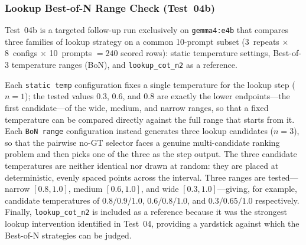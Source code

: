 \subsubsection{Lookup Best-of-N Range Check (Test~04b)}
\label{subsec:res04b}

Test~04b is a targeted follow-up run exclusively on \texttt{gemma4:e4b} that
compares three families of lookup strategy on a common 10-prompt subset
(3~repeats $\times$ 8~configs $\times$ 10~prompts $= 240$ scored rows): static
temperature settings, Best-of-3 temperature ranges (BoN), and
\texttt{lookup\_cot\_n2} as a reference.

Each \texttt{static temp} configuration fixes a single temperature for the
lookup step ($n=1$); the tested values $0.3$, $0.6$, and $0.8$ are exactly the
lower endpoints---the first candidate---of the wide, medium, and narrow ranges,
so that a fixed temperature can be compared directly against the full range that
starts from it. Each \texttt{BoN range} configuration instead generates three
lookup candidates ($n=3$), so that the pairwise no-GT selector faces a genuine
multi-candidate ranking problem and then picks one of the three as the step
output. The three candidate temperatures are neither identical nor drawn at
random: they are placed at deterministic, evenly spaced points across the
interval. Three ranges are
tested---narrow $[0.8,1.0]$, medium $[0.6,1.0]$, and wide $[0.3,1.0]$---giving,
for example, candidate temperatures of $0.8/0.9/1.0$, $0.6/0.8/1.0$, and
$0.3/0.65/1.0$ respectively. Finally, \texttt{lookup\_cot\_n2} is included as a
reference because it was the strongest lookup intervention identified in
Test~04, providing a yardstick against which the Best-of-N strategies can be
judged.
